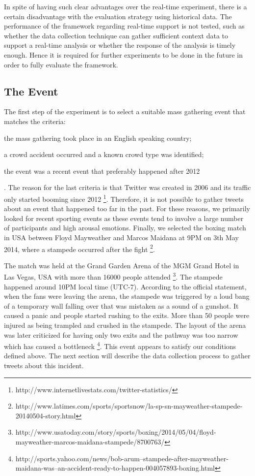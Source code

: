 In spite of having such clear advantages over the real-time experiment, there is a certain disadvantage with the evaluation strategy using historical data. The performance of the framework regarding real-time support is not tested, such as whether the data collection technique can gather sufficient context data to support a real-time analysis or whether the response of the analysis is timely enough. Hence it is required for further experiments to be done in the future in order to fully evaluate the framework.

\subsection{The Event}
The first step of the experiment is to select a suitable mass gathering event that matches the criteria:
\begin{inparaenum}[i)]
\item the mass gathering took place in an English speaking country;
\item a crowd accident occurred and a known crowd type was identified;
\item the event was a recent event that preferably happened after 2012
\end{inparaenum}. The reason for the last criteria is that Twitter was created in 2006 and its traffic only started booming since 2012 \footnote{http://www.internetlivestats.com/twitter-statistics/}. Therefore, it is not possible to gather tweets about an event that happened too far in the past. For these reasons, we primarily looked for recent sporting events as these events tend to involve a large number of participants and high arousal emotions. Finally, we selected the boxing match in USA between Floyd Mayweather and Marcos Maidana at 9PM on 3th May 2014, where a stampede occurred after the fight \footnote{http://www.latimes.com/sports/sportsnow/la-sp-sn-mayweather-stampede-20140504-story.html}.

The match was held at the Grand Garden Arena of the MGM Grand Hotel in Las Vegas, USA with more than 16000 people attended \footnote{http://www.usatoday.com/story/sports/boxing/2014/05/04/floyd-mayweather-marcos-maidana-stampede/8700763/}. The stampede happened around 10PM local time (UTC-7). According to the official statement, when the fans were leaving the arena, the stampede was triggered by a loud bang of a temporary wall falling over that was mistaken as a sound of a gunshot. It caused a panic and people started rushing to the exits. More than 50 people were injured as being trampled and crushed in the stampede. The layout of the arena was later criticized for having only two exits and the pathway was too narrow which has caused a bottleneck \footnote{http://sports.yahoo.com/news/bob-arum--stampede-after-mayweather-maidana-was--an-accident-ready-to-happen-004057893-boxing.html}. This event appears to satisfy our conditions defined above. The next section will describe the data collection process to gather tweets about this incident.

